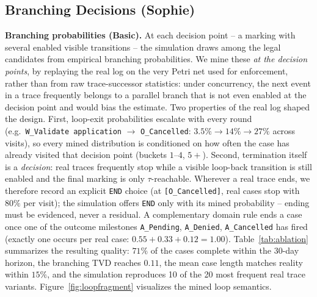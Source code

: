 \documentclass[
  english,        %
  font=times,     %
  twocolumn,      %
]{tumarticle}
\begin{document}
\subsection{Branching Decisions (Sophie)}
\label{sec:branching}
\textbf{Branching probabilities (Basic).} At each decision point -- a
marking with several enabled visible transitions -- the simulation draws
among the legal candidates from empirical branching probabilities. We mine
these \emph{at the decision points}, by replaying the real log on the very
Petri net used for enforcement, rather than from raw trace-successor
statistics: under concurrency, the next event in a trace frequently belongs
to a parallel branch that is not even enabled at the decision point and
would bias the estimate. Two properties of the real log shaped the design.
First, loop-exit probabilities escalate with every round (e.g.\
\texttt{W\_Validate application} $\rightarrow$ \texttt{O\_Cancelled}:
$3.5\% \rightarrow 14\% \rightarrow 27\%$ across visits), so every mined
distribution is conditioned on how often the case has already visited that
decision point (buckets $1$--$4$, $5{+}$). Second, termination itself is a
\emph{decision}: real traces frequently stop while a visible loop-back
transition is still enabled and the final marking is only
$\tau$-reachable. Wherever a real trace ends, we therefore record an
explicit \texttt{END} choice (at \texttt{[O\_Cancelled]}, real cases stop
with $80\%$ per visit); the simulation offers \texttt{END} only with its
mined probability -- ending must be evidenced, never a residual. A
complementary domain rule ends a case once one of the outcome milestones
\texttt{A\_Pending}, \texttt{A\_Denied}, \texttt{A\_Cancelled} has fired
(exactly one occurs per real case: $0.55+0.33+0.12=1.00$).
Table~\ref{tab:ablation} summarizes the resulting quality: $71\%$ of the
cases complete within the 30-day horizon, the branching TVD reaches
$0.11$, the mean case length matches reality within $15\%$, and the
simulation reproduces 10 of the 20 most frequent real trace variants.
Figure~\ref{fig:loopfragment} visualizes the mined loop semantics.
\end{document}
